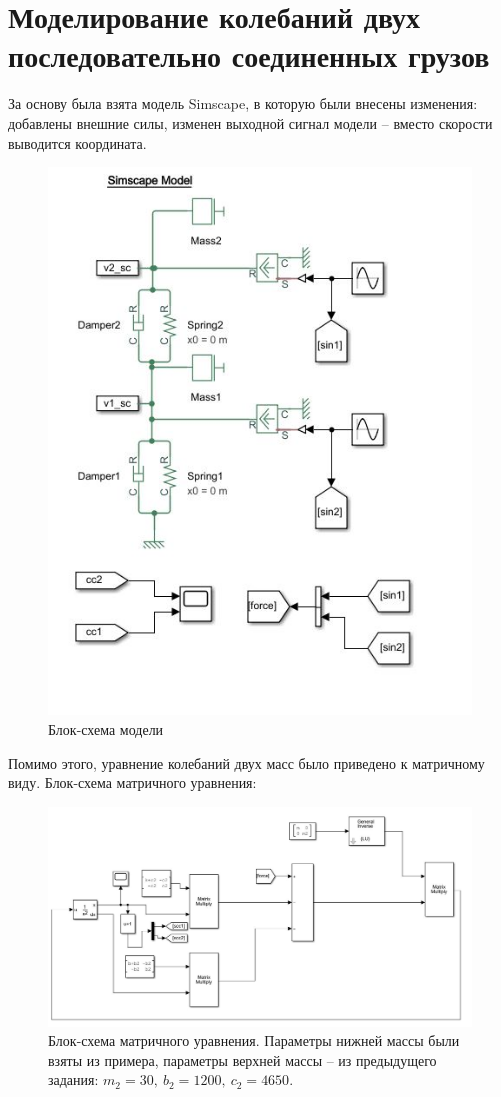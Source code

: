 \documentclass{article}
\begin{document}
	\section*{Моделирование колебаний двух последовательно соединенных грузов}
	За основу была взята модель Simscape, в которую были внесены изменения: добавлены внешние силы, изменен выходной сигнал модели -- вместо скорости выводится координата.
	\begin{figure}[H]
		\centering
		\includegraphics[width=0.7\linewidth]{sx_2}
		\caption{Блок-схема модели}
		\label{fig:sx2}
	\end{figure}
	Помимо этого, уравнение колебаний двух масс было приведено к матричному виду. Блок-схема матричного уравнения:
	\begin{figure}[H]
		\centering
		\includegraphics[width=1\linewidth]{matr_sx}
		\caption{Блок-схема матричного уравнения. Параметры нижней массы были взяты из примера, параметры верхней массы -- из предыдущего задания: $m_2 = 30,\ b_2 = 1200,\ c_2 = 4650$.}
		\label{fig:matrsx}
	\end{figure}
\end{document}
